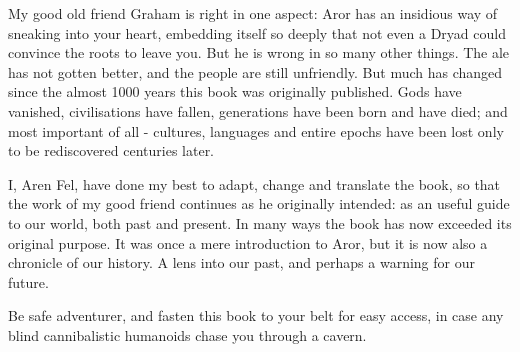My good old friend Graham is right in one aspect: Aror has an insidious
way of sneaking into your heart, embedding itself so deeply that not
even a Dryad could convince the roots to leave you. But he is wrong in
so many other things. The ale has not gotten better, and the people
are still unfriendly. But much has changed since the almost 1000 years
this book was originally published. Gods have vanished, civilisations
have fallen, generations have been born and have died; and most important
of all - cultures, languages and entire epochs have been lost only to be
rediscovered centuries later.

I, Aren Fel, have done my best to adapt, change and translate the
book, so that the work of my good friend continues as he originally
intended: as an useful guide to our world, both past and present. In
many ways the book has now exceeded its original purpose. It was once
a mere introduction to Aror, but it is now also a chronicle of our
history. A lens into our past, and perhaps a warning for our future.

Be safe adventurer, and fasten this book to your belt for easy access,
in case any blind cannibalistic humanoids chase you through a cavern.
\twocolumn
